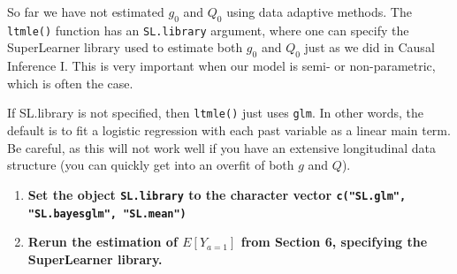 \documentclass[answers]{exam}
\begin{document}
So far we have not estimated $g_0$ and $Q_0$ using data adaptive methods. The \texttt{ltmle()} function has an \texttt{SL.library} argument, where one can specify the SuperLearner library used to estimate both $g_0$ and $Q_0$ just as we did in Causal Inference I. This is very important when our model is semi- or non-parametric, which is often the case. 

If SL.library is not specified, then \texttt{ltmle()} just uses \texttt{glm}. In other words, the default is to fit a logistic regression with each past variable as a linear main term. Be careful, as this will not work well if you have an extensive longitudinal data structure (you can quickly get into an overfit of both $g$ and $Q$).

\begin{enumerate}
\item \textbf{Set the object \texttt{SL.library} to the character vector \texttt{c("SL.glm", "SL.bayesglm", "SL.mean")}}
\item \textbf{Rerun the estimation of $E[Y_{a=1}]$ from Section 6, specifying the SuperLearner library.}
\end{enumerate}
\end{document}
